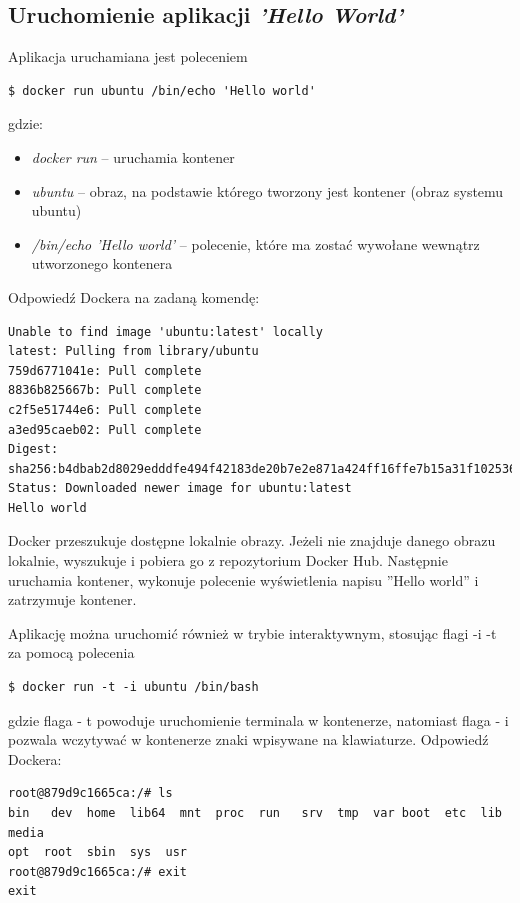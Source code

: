 \subsection{Uruchomienie aplikacji \textit{'Hello World'}}
Aplikacja uruchamiana jest poleceniem
\begin{lstlisting}[style=incode]
$ docker run ubuntu /bin/echo 'Hello world'
\end{lstlisting}
gdzie:
\begin{itemize}
\item \textit{docker run} – uruchamia kontener
\item \textit{ubuntu} – obraz, na podstawie którego tworzony jest kontener (obraz systemu ubuntu)
\item \textit{/bin/echo  'Hello world'} – polecenie, które ma zostać wywołane wewnątrz 	utworzonego kontenera \newline
\end{itemize}
Odpowiedź Dockera na zadaną komendę:
\begin{lstlisting}[style=incode]
Unable to find image 'ubuntu:latest' locally
latest: Pulling from library/ubuntu
759d6771041e: Pull complete
8836b825667b: Pull complete
c2f5e51744e6: Pull complete
a3ed95caeb02: Pull complete
Digest: sha256:b4dbab2d8029edddfe494f42183de20b7e2e871a424ff16ffe7b15a31f102536
Status: Downloaded newer image for ubuntu:latest
Hello world
\end{lstlisting}

Docker przeszukuje dostępne lokalnie obrazy. Jeżeli nie znajduje  danego obrazu lokalnie, wyszukuje i pobiera go z  repozytorium Docker Hub. Następnie uruchamia kontener, wykonuje polecenie wyświetlenia napisu ''Hello world'' i zatrzymuje kontener.


Aplikację można uruchomić również w trybie interaktywnym, stosując flagi -i -t za pomocą polecenia
\begin{lstlisting}[style=incode]
$ docker run -t -i ubuntu /bin/bash
\end{lstlisting}
gdzie flaga - t powoduje uruchomienie terminala w kontenerze, natomiast flaga - i pozwala wczytywać w kontenerze znaki wpisywane na klawiaturze.
Odpowiedź Dockera:
\begin{lstlisting}[style=incode]
root@879d9c1665ca:/# ls
bin   dev  home  lib64  mnt  proc  run   srv  tmp  var boot  etc  lib   media  
opt  root  sbin  sys  usr
root@879d9c1665ca:/# exit
exit
\end{lstlisting}

